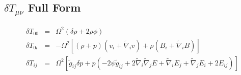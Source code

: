 \documentclass[10pt,letterpaper]{article}
\numberwithin{equation}{section}
\begin{document}
\begin{appendices}

\section{$\delta T_{\mu\nu}$ Full Form}

\begin{eqnarray}
\delta T_{00} &=& \Omega^2 ( \delta \rho + 2\rho \phi)
\nonumber\\
\delta T_{0i} &=& -\Omega^2 \left[ (\rho+p)(v_i +\tilde\nabla_i v)+\rho(B_i +\tilde\nabla_i B)\right]
\nonumber\\
\delta T_{ij} &=& \Omega^2 \left[ \tilde g_{ij} \delta p + p(-2\psi \tilde g_{ij} + 2\tilde \nabla_i \tilde\nabla_j E + \tilde\nabla_i E_j + \tilde\nabla_j E_i + 2E_{ij})\right]
\end{eqnarray}



\end{appendices}
\end{document}

